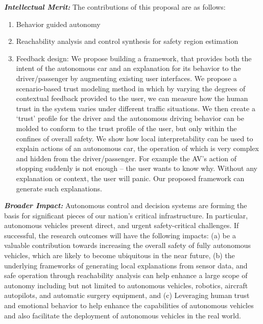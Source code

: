\noindent\emph{\textbf{Intellectual Merit:}} The contributions of this proposal are as follows:
\begin{enumerate}
    \item Behavior guided autonomy  
    \item Reachability analysis and control synthesis for safety region estimation 
    \item Feedback design: We propose building a framework, that provides both the intent of the autonomous car and an explanation for its behavior to the driver/passenger by augmenting existing user interfaces. We propose a scenario-based trust modeling method in which by varying the degrees of contextual feedback provided to the user, we can measure how the human trust in the system varies under different traffic situations. We then create a ‘trust’ profile for the driver and the autonomous driving behavior can be molded to conform to the trust profile of the user, but only within the confines of overall safety. We show how local interpretability can be used to explain actions of an autonomous car, the operation of which is very complex and hidden from the driver/passenger. For example the AV’s action of stopping suddenly is not enough – the user wants to know why. Without any explanation or context, the user will panic. Our proposed framework can generate such explanations. 
\end{enumerate}


\noindent\emph{\textbf{Broader Impact:}} 
Autonomous control and decision systems are forming the basis for significant pieces of our nation’s critical infrastructure. In particular, autonomous vehicles present direct, and urgent safety-critical challenges. If successful, the research outcomes will have the following impacts: (a) be a valuable contribution towards increasing the overall safety of fully autonomous vehicles, which are likely to become ubiquitous in the near future, (b) the underlying frameworks of generating local explanations from sensor data, and safe operation through reachability analysis can help enhance a large scope of autonomy including but not limited to autonomous vehicles, robotics, aircraft autopilots, and automatic surgery equipment, and (c) Leveraging human trust and emotional behavior to help enhance the capabilities of autonomous vehicles and also facilitate the deployment of autonomous vehicles in the real world. 

